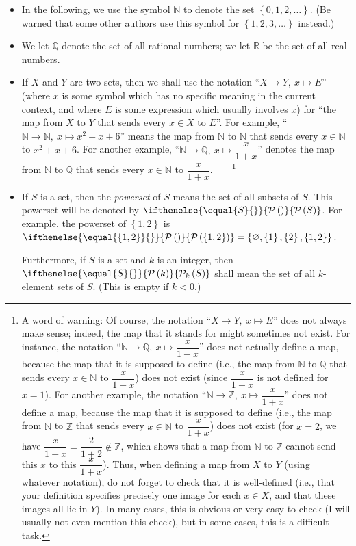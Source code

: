 \documentclass[numbers=enddot,12pt,final,onecolumn,notitlepage]{scrartcl}%
\theoremstyle{definition}
\newcommand{\NN}{\mathbb{N}}
\newcommand{\ZZ}{\mathbb{Z}}
\newcommand{\QQ}{\mathbb{Q}}
\newcommand{\RR}{\mathbb{R}}
\newcommand{\powset}[2][]{\ifthenelse{\equal{#2}{}}{\mathcal{P}\left(#1\right)}{\mathcal{P}_{#1}\left(#2\right)}}
\begin{document}
\begin{itemize}
\item In the following, we use the symbol $\NN$ to denote the set
$\left\{ 0, 1, 2, \ldots \right\}$. (Be warned that some other authors
use this symbol for $\left\{ 1, 2, 3, \ldots \right\}$ instead.)

\item We let $\QQ$ denote the set of all rational numbers; we let
$\RR$ be the set of all real numbers.

\item If $X$ and $Y$ are two sets, then we shall use the notation
``$X\rightarrow Y,\ x\mapsto E$'' (where $x$
is some symbol which has no specific meaning in the current context,
and where $E$ is some expression which usually involves $x$) for ``the
map from $X$ to $Y$ that sends every $x\in X$ to $E$''. For
example, ``$\NN\rightarrow\NN,\ x\mapsto x^{2}+x+6$'' means the map
from $\NN$ to $\NN$ that sends every $x\in\NN$ to $x^{2}+x+6$. For
another example, ``$\NN\rightarrow\QQ,\ x\mapsto\dfrac{x}{1+x}$''
denotes the map from $\NN$ to $\QQ$ that
sends every $x\in\NN$ to $\dfrac{x}{1+x}$.\ \ \ \ \footnote{A word of
warning: Of course, the notation ``$X\rightarrow Y,\ x\mapsto E$''
does not always make sense; indeed, the map that it
stands for might sometimes not exist. For instance, the notation
``$\NN\rightarrow\QQ,\ x\mapsto\dfrac{x}{1-x}$'' does not actually
define a map, because the map that it
is supposed to define (i.e., the map from $\NN$ to $\QQ$ that
sends every $x\in\NN$ to $\dfrac{x}{1-x}$) does not exist (since
$\dfrac{x}{1-x}$ is not defined for $x=1$). For another example, the
notation ``$\NN\rightarrow\ZZ,\ x\mapsto\dfrac{x}{1+x}$'' does not
define a map, because the map that it is
supposed to define (i.e., the map from $\NN$ to $\ZZ$ that
sends every $x\in\NN$ to $\dfrac{x}{1+x}$) does not exist (for $x=2$,
we have $\dfrac{x}{1+x}=\dfrac{2}{1+2}\notin\ZZ$, which shows that a
map from $\NN$ to $\ZZ$ cannot send this $x$ to this $\dfrac
{x}{1+x}$). Thus, when defining a map from $X$ to $Y$ (using whatever
notation), do not forget to check that it is well-defined (i.e., that
your definition specifies precisely one image for each $x\in X$, and
that these images all lie in $Y$). In many cases, this is obvious or
very easy to check (I will usually not even mention this check), but
in some cases, this is a difficult task.}

\item If $S$ is a set, then the \textit{powerset} of $S$ means the set
of all subsets of $S$. This powerset will be denoted by
$\powset{S}$. %
For example, the powerset of $\left\{  1,2\right\}  $ is
$\powset{ \left\{  1,2\right\} }
=\left\{  \varnothing,\left\{
1\right\}  ,\left\{  2\right\}  ,\left\{  1,2\right\}  \right\}  $.

Furthermore, if $S$ is a set and $k$ is an integer, then
$\powset[k]{S}$ %
shall mean the set of all $k$-element sets of $S$. (This is empty if
$k < 0$.)
\end{itemize}
\end{document}
